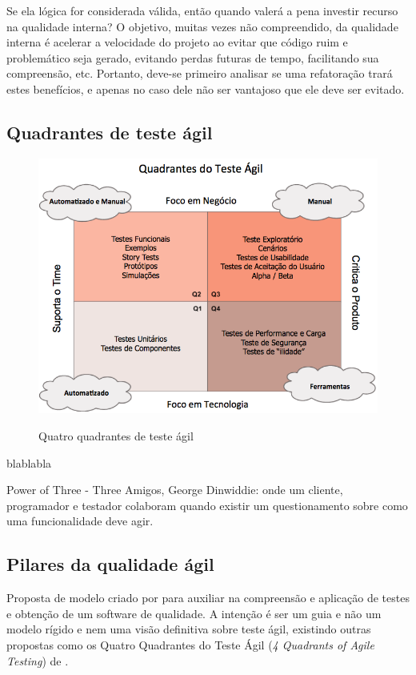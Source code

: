 \documentclass[
	12pt,				%
	openright,			%
	oneside,			%
	a4paper,			%
	english,			%
	brazil,				%
	]{abntex2}
\begin{document}
Se ela lógica for considerada válida, então quando valerá a pena investir recurso na qualidade interna? O objetivo, muitas vezes não compreendido, da qualidade interna é acelerar a velocidade do projeto ao evitar que código ruim e problemático seja gerado, evitando perdas futuras de tempo, facilitando sua compreensão, etc. Portanto, deve-se primeiro analisar se uma refatoração trará estes benefícios, e apenas no caso dele não ser vantajoso que ele deve ser evitado.



\subsection{Quadrantes de teste ágil}
\begin{figure}[H]
    \centering
    \caption{Quatro quadrantes de teste ágil}
    \graphicspath{ {./graphics/agile/} }
    \includegraphics[scale=0.6]{Quadrante-Teste-Agil}
    \label{fig:quatro-quadrantes}
\end{figure}

blablabla

Power of Three - Three Amigos, George Dinwiddie: onde um cliente, programador e testador colaboram quando existir um questionamento sobre como uma funcionalidade deve agir.

\subsection{Pilares da qualidade ágil}
Proposta de modelo criado por  para auxiliar na compreensão e aplicação de testes e obtenção de um software de qualidade. A intenção é ser um guia e não um modelo rígido e nem uma visão definitiva sobre teste ágil, existindo outras propostas como os Quatro Quadrantes do Teste Ágil (\emph{4 Quadrants of Agile Testing}) de .
\end{document}
